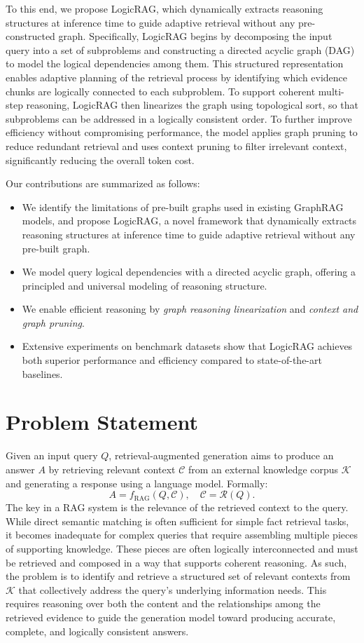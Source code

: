 \documentclass[letterpaper]{article} %
\begin{document}
To this end, we propose LogicRAG, which dynamically extracts reasoning structures at inference time to guide adaptive retrieval without any pre-constructed graph.
Specifically, LogicRAG begins by decomposing the input query into a set of subproblems and constructing a directed acyclic graph (DAG) to model the logical dependencies among them. This structured representation enables adaptive planning of the retrieval process by identifying which evidence chunks are logically connected to each subproblem. To support coherent multi-step reasoning, LogicRAG then linearizes the graph using topological sort, so that subproblems can be addressed in a logically consistent order. To further improve efficiency without compromising performance, the model applies graph pruning to reduce redundant retrieval and uses context pruning to filter irrelevant context, significantly reducing the overall token cost.


Our contributions are summarized as follows:
\begin{itemize}
    \item We identify the limitations of pre-built graphs used in existing GraphRAG models, and propose LogicRAG, a novel framework that dynamically extracts reasoning structures at inference time to guide adaptive retrieval without any pre-built graph.
    \item We model query logical dependencies with a directed acyclic graph, offering a principled and universal modeling of reasoning structure.
    \item We enable efficient reasoning by \textit{graph reasoning linearization} and \textit{context and graph pruning}.
    \item Extensive experiments on benchmark datasets show that  LogicRAG achieves both superior performance and efficiency compared to state-of-the-art baselines.
\end{itemize}


\section{Problem Statement}

Given an input query \( Q \), retrieval-augmented generation aims to produce an answer \( A \) by retrieving relevant context \( \mathcal{C} \) from an external knowledge corpus \( \mathcal{K} \) and generating a response using a language model. Formally:
\[
A = f_{\mathrm{RAG}}(Q, \mathcal{C}), \quad \mathcal{C} = \mathcal{R}(Q).
\]
The key in a RAG system is the relevance of the retrieved context to the query. While direct semantic matching is often sufficient for simple fact retrieval tasks, it becomes inadequate for complex queries that require assembling multiple pieces of supporting knowledge. These pieces are often logically interconnected and must be retrieved and composed in a way that supports coherent reasoning. As such, the problem is to identify and retrieve a structured set of relevant contexts from \( \mathcal{K} \) that collectively address the query's underlying information needs. This requires reasoning over both the content and the relationships among the retrieved evidence to guide the generation model toward producing accurate, complete, and logically consistent answers.
\end{document}
